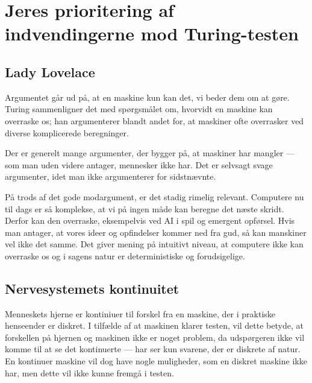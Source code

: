 \documentclass{article}
\begin{document}

\section{Jeres prioritering af indvendingerne mod Turing-testen}
\subsection{Lady Lovelace}
Argumentet går ud på, at en maskine kun kan det, vi beder dem om at gøre. Turing sammenligner det med spørgsmålet om, hvorvidt en maskine kan overraske os; han argumenterer blandt andet for, at maskiner ofte overrasker ved diverse komplicerede beregninger.

Der er generelt mange argumenter, der bygger på, at maskiner har mangler --- som man uden videre antager, mennesker ikke har. Det er selvsagt svage argumenter, idet man ikke argumenterer for sidstnævnte.

På trods af det gode modargument, er det stadig rimelig relevant. Computere nu til dags er så komplekse, at vi på ingen måde kan beregne det næste skridt. Derfor kan den overraske, eksempelvis ved AI i spil og emergent opførsel. Hvis man antager, at vores ideer og opfindelser kommer ned fra gud, så kan manskiner vel ikke det samme. Det giver mening på intuitivt niveau, at computere ikke kan overraske os og i sagens natur er deterministiske og forudsigelige.

\subsection{Nervesystemets kontinuitet}

Menneskets hjerne er kontiniuer til forskel fra en maskine, der i praktiske henseender er diskret. I tilfælde af at maskinen klarer testen, vil dette betyde, at forskellen på hjernen og maskinen ikke er noget problem, da udspørgeren ikke vil komme til at se det kontinuerte --- har ser kun svarene, der er diskrete af natur. En kontinuer maskine vil dog have nogle muligheder, som en diskret maskine ikke har, men dette vil ikke kunne fremgå i testen.
\end{document}
